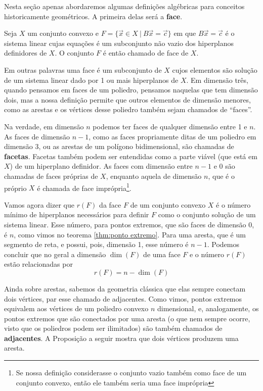 Nesta seção apenas abordaremos algumas definições algébricas para conceitos historicamente geométricos. A primeira delas será a \textbf{face}.

\begin{def:face}
	Seja $X$ um conjunto convexo e $F = \{\vec{x} \in X\ |\ B\vec{x} = \vec{c}\}$ em que $B\vec{x} = \vec{c}$ é o sistema linear cujas equações é um subconjunto não vazio dos hiperplanos definidores de $X$. O conjunto $F$ é então chamado de face de $X$. 
\end{def:face}

Em outras palavras uma face é um subconjunto de $X$ cujos elementos são solução de um sistema linear dado por 1 ou mais hiperplanos de $X$. Em dimensão três, quando pensamos em faces de um poliedro, pensamos naquelas que tem dimensão dois, mas a nossa definição permite que outros elementos de dimensão menores, como as arestas e os vértices desse poliedro também sejam chamados de ``faces''. 

Na verdade, em dimensão $n$ podemos ter faces de qualquer dimensão entre 1 e $n$. As faces de dimensão $n - 1$, como as faces propriamente ditas de um poliedro em dimensão 3, ou as arestas de um polígono bidimensional, são chamadas de \textbf{facetas}. Facetas também podem ser entendidas como a parte viável (que está em $X$) de um hiperplano definidor.  As faces com dimensão entre $n - 1$ e $0$ são chamadas de faces próprias de $X$, enquanto aquela de dimensão $n$, que é o próprio $X$ é chamada de face imprópria\footnote{Se nossa definição considerasse o conjunto vazio também como face de um conjunto convexo, então ele também seria uma face imprópria}.

Vamos agora dizer que $r(F)$ da face $F$ de um conjunto convexo $X$ é o número mínimo de hiperplanos necessários para definir $F$ como o conjunto solução de um sistema linear. Esse número, para pontos extremos, que são faces de dimensão 0, é $n$, como vimos no teorema \ref{thm:ponto extremo}. Para uma aresta, que é um segmento de reta, e possui, pois, dimensão 1, esse número é $n - 1$. Podemos concluir que no geral a dimensão $\dim(F)$ de uma face $F$ e o número $r(F)$ estão relacionadas por
\begin{equation*}
	r(F)= n - \dim(F)
\end{equation*} 

Ainda sobre arestas, sabemos da geometria clássica que elas sempre conectam dois vértices, par esse chamado de adjacentes. Como vimos, pontos extremos equivalem aos vértices de um poliedro convexo $n$ dimensional, e, analogamente, os pontos extremos que são conectados por uma aresta (o que nem sempre ocorre, visto que os poliedros podem ser ilimitados) são também chamados de \textbf{adjacentes}. A Proposição a seguir mostra que dois vértices produzem uma aresta.

